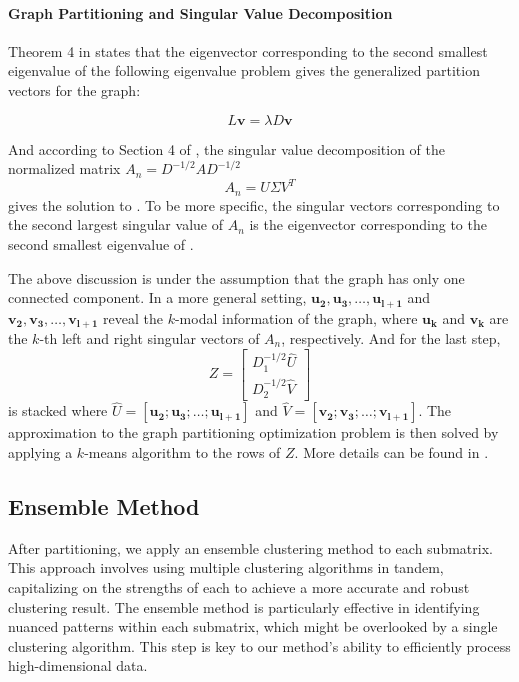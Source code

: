 \paragraph{Graph Partitioning and Singular Value Decomposition}
Theorem 4 in \cite{dhillon2001CoclusteringDocumentsWords} states that the eigenvector corresponding to the second smallest eigenvalue of the following eigenvalue problem gives the generalized partition vectors for the graph:

\begin{equation}
    L \mathbf{v} = \lambda D \mathbf{v}
    \label{eq:eigenvalue_problem}
\end{equation}

And according to Section 4 of \cite{dhillon2001CoclusteringDocumentsWords}, the singular value decomposition of the normalized matrix $A_n = D^{-1/2} A D^{-1/2}$
$$A_n = U \Sigma V^T$$
gives the solution to . To be more specific, the singular vectors corresponding to the second largest singular value of $A_n$ is the eigenvector corresponding to the second smallest eigenvalue of .

The above discussion is under the assumption that the graph has only one connected component. In a more general setting, $\mathbf{u_2}, \mathbf{u_3}, \ldots, \mathbf{u_{l+1}}$ and $\mathbf{v_2}, \mathbf{v_3}, \ldots, \mathbf{v_{l+1}}$ reveal the $k$-modal information of the graph, where $\mathbf{u_k}$ and $\mathbf{v_k}$ are the $k$-th left and right singular vectors of $A_n$, respectively.
And for the last step, 
$$ Z = \begin{bmatrix} D_1^{-1/2} \hat{U} \\ D_2^{-1/2} \hat{V} \end{bmatrix} $$
is stacked where $\hat{U} = [\mathbf{u_2}; \mathbf{u_3}; \ldots; \mathbf{u_{l+1}}]$ and $\hat{V} = [\mathbf{v_2}; \mathbf{v_3}; \ldots; \mathbf{v_{l+1}}]$. The approximation to the graph partitioning optimization problem is then solved by applying a $k$-means algorithm to the rows of $Z$. More details can be found in \cite{dhillon2001CoclusteringDocumentsWords}.

\subsection{Ensemble Method}
After partitioning, we apply an ensemble clustering method to each submatrix. This approach involves using multiple clustering algorithms in tandem, capitalizing on the strengths of each to achieve a more accurate and robust clustering result. The ensemble method is particularly effective in identifying nuanced patterns within each submatrix, which might be overlooked by a single clustering algorithm. This step is key to our method's ability to efficiently process high-dimensional data.

